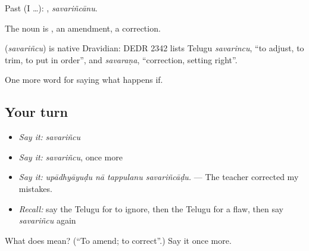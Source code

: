 Past (I …): , \emph{savariñcānu}.

The noun is , an amendment, a correction.

\begin{cousinweb}
\textbf{} (\emph{savariñcu}) is native Dravidian: DEDR 2342 lists Telugu \emph{savarincu}, \textquotedblleft{}to adjust, to trim, to put in order\textquotedblright{}, and \emph{savaraṇa}, \textquotedblleft{}correction, setting right\textquotedblright{}.
\end{cousinweb}

\begin{grammarlens}[title={What you've built}]
One more word for saying what happens if.
\end{grammarlens}

\subsection*{Your turn}
\begin{itemize}
\raggedright
  \item \emph{Say it:} \emph{savariñcu}
  \item \emph{Say it:} \emph{savariñcu}, once more
  \item \emph{Say it:} \emph{upādhyāyuḍu nā tappulanu savariñcāḍu.} — The teacher corrected my mistakes.
  \item \emph{Recall:} say the Telugu for to ignore, then the Telugu for a flaw, then say \emph{savariñcu} again
\end{itemize}

\begin{tcolorbox}[breakable,colback=teal!4,colframe=teal!35!black,title={Before you move on}]
What does  mean? (\textquotedblleft{}To amend; to correct\textquotedblright{}.) Say it once more.
\end{tcolorbox}
